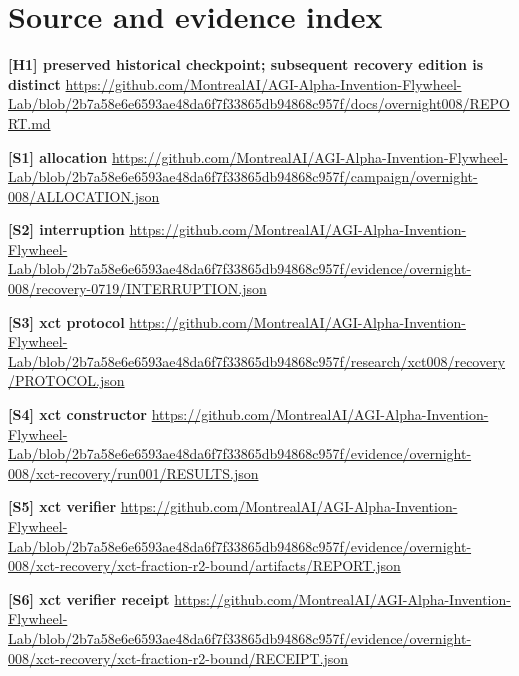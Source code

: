 \documentclass[11pt,letterpaper]{article}
\begin{document}
\section{Source and evidence index}
\begin{samepage}\small\textbf{[H1] preserved historical checkpoint; subsequent recovery edition is distinct} \url{https://github.com/MontrealAI/AGI-Alpha-Invention-Flywheel-Lab/blob/2b7a58e6e6593ae48da6f7f33865db94868c957f/docs/overnight008/REPORT.md}\par\normalsize\end{samepage}
\begin{samepage}\small\textbf{[S1] allocation} \url{https://github.com/MontrealAI/AGI-Alpha-Invention-Flywheel-Lab/blob/2b7a58e6e6593ae48da6f7f33865db94868c957f/campaign/overnight-008/ALLOCATION.json}\par\normalsize\end{samepage}
\begin{samepage}\small\textbf{[S2] interruption} \url{https://github.com/MontrealAI/AGI-Alpha-Invention-Flywheel-Lab/blob/2b7a58e6e6593ae48da6f7f33865db94868c957f/evidence/overnight-008/recovery-0719/INTERRUPTION.json}\par\normalsize\end{samepage}
\begin{samepage}\small\textbf{[S3] xct protocol} \url{https://github.com/MontrealAI/AGI-Alpha-Invention-Flywheel-Lab/blob/2b7a58e6e6593ae48da6f7f33865db94868c957f/research/xct008/recovery/PROTOCOL.json}\par\normalsize\end{samepage}
\begin{samepage}\small\textbf{[S4] xct constructor} \url{https://github.com/MontrealAI/AGI-Alpha-Invention-Flywheel-Lab/blob/2b7a58e6e6593ae48da6f7f33865db94868c957f/evidence/overnight-008/xct-recovery/run001/RESULTS.json}\par\normalsize\end{samepage}
\begin{samepage}\small\textbf{[S5] xct verifier} \url{https://github.com/MontrealAI/AGI-Alpha-Invention-Flywheel-Lab/blob/2b7a58e6e6593ae48da6f7f33865db94868c957f/evidence/overnight-008/xct-recovery/xct-fraction-r2-bound/artifacts/REPORT.json}\par\normalsize\end{samepage}
\begin{samepage}\small\textbf{[S6] xct verifier receipt} \url{https://github.com/MontrealAI/AGI-Alpha-Invention-Flywheel-Lab/blob/2b7a58e6e6593ae48da6f7f33865db94868c957f/evidence/overnight-008/xct-recovery/xct-fraction-r2-bound/RECEIPT.json}\par\normalsize\end{samepage}
\end{document}
